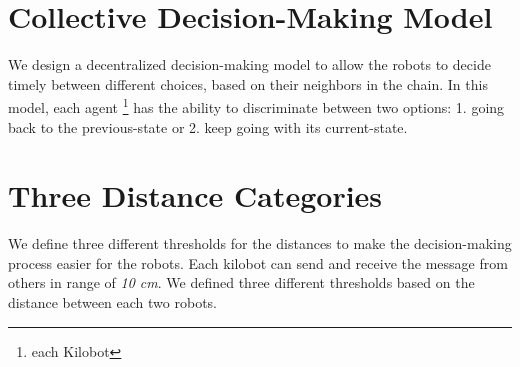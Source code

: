 \documentclass[11pt,a4paper]{article}
\begin{document}
\section{Collective Decision-Making Model}
We design a decentralized decision-making model to allow the robots to decide timely between different choices, based on their neighbors in the chain. In this model, each agent \footnote{each Kilobot} has the ability to discriminate between two options: 1. going back to the previous-state or 2. keep going with its current-state. 

\section{Three Distance Categories}
We define three different thresholds for the distances to make the decision-making process easier for the robots. Each kilobot can send and receive the message from others in range of \textit{10 cm}. We defined three different thresholds based on the distance between each two robots. 
\end{document}

